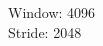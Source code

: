 \documentclass[preview]{standalone}
\begin{document}
\begin{center}
Window: 4096\\Stride: 2048
\end{center}
\end{document}
